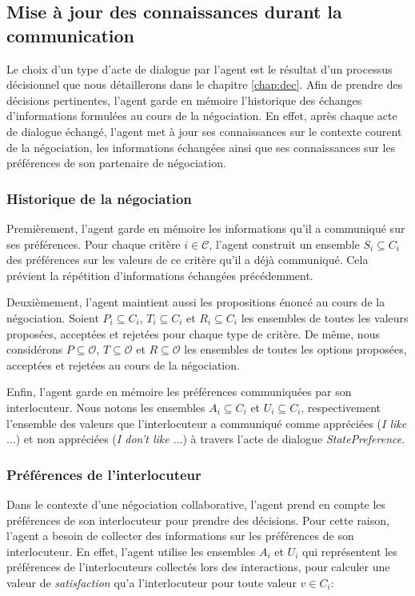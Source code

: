 		
			\subsection{Mise à jour des connaissances durant la communication}
			
			Le choix d'un type d'acte de dialogue par l'agent est le résultat d'un processus décisionnel que nous détaillerons dans le chapitre \ref{chap:dec}. 
			Afin de prendre des décisions pertinentes, l'agent garde en mémoire l'historique des échanges d'informations formulées au cours de la négociation.  En effet, après chaque acte de dialogue échangé, l'agent met à jour ses connaissances sur le contexte courent de la négociation, les informations échangées ainsi que ses connaissances sur les préférences de son partenaire de négociation.  
			
			\subsubsection{Historique de la négociation}
			Premièrement, l'agent garde en mémoire les informations qu'il a communiqué sur ses préférences.			
			Pour chaque critère $i\in\mathcal{C}$, l'agent construit un ensemble $S_i \subseteq C_i$ des préférences sur les valeurs de ce critère qu'il a déjà communiqué. Cela prévient la répétition d'informations échangées précédemment. 
			
			Deuxièmement, l'agent maintient aussi les propositions énoncé au cours de la négociation. Soient $P_i \subseteq C_i$, $T_i\subseteq C_i$ et $R_i\subseteq C_i$ les ensembles de toutes les valeurs proposées, acceptées et rejetées pour chaque type de critère. 
			De même, nous considérons $P\subseteq \mathcal{O}$, $T\subseteq \mathcal{O}$ et $R\subseteq \mathcal{O}$ les ensembles de toutes les options proposées, acceptées et rejetées au cours de la négociation.
			
			
			Enfin, l'agent garde en mémoire les préférences communiquées par son interlocuteur. Nous notons les ensembles $A_i\subseteq C_i$ et $U_i\subseteq C_i$, respectivement l'ensemble des valeurs que l'interlocuteur a communiqué comme appréciées (\textit{I like $\ldots$}) et non appréciées  (\textit{I don't like $\ldots$}) à travers l'acte de dialogue \textit{StatePreference}.
			
			
			
			\subsubsection{Préférences de  l'interlocuteur}
				Dans le contexte d'une négociation collaborative, l'agent prend en compte les préférences de son interlocuteur pour prendre des décisions. Pour cette raison, l'agent a besoin de collecter des informations sur les préférences de son interlocuteur. En effet, l'agent utilise les ensembles $A_i$ et $U_i$ qui représentent les préférences de l'interlocuteurs collectés lors des interactions, pour calculer une valeur de \emph{satisfaction}  qu'a l'interlocuteur pour toute valeur $v\in C_i$: 
				
